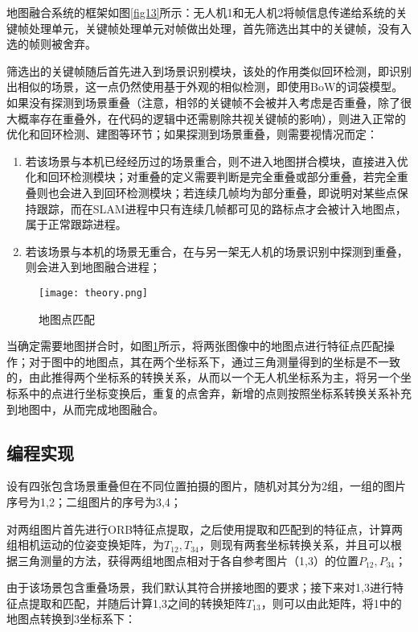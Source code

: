 地图融合系统的框架如图\ref{fig13}所示：无人机1和无人机2将帧信息传递给系统的关键帧处理单元，关键帧处理单元对帧做出处理，首先筛选出其中的关键帧，没有入选的帧则被舍弃。

筛选出的关键帧随后首先进入到场景识别模块，该处的作用类似回环检测，即识别出相似的场景，这一点仍然使用基于外观的相似检测，即使用BoW的词袋模型。如果没有探测到场景重叠（注意，相邻的关键帧不会被并入考虑是否重叠，除了很大概率存在重叠外，在代码的逻辑中还需剔除共视关键帧的影响），则进入正常的优化和回环检测、建图等环节；如果探测到场景重叠，则需要视情况而定\cite{forster2013collaborative}：

\begin{enumerate}
	\item 若该场景与本机已经经历过的场景重合，则不进入地图拼合模块，直接进入优化和回环检测模块；对重叠的定义需要判断是完全重叠或部分重叠，若完全重叠则也会进入到回环检测模块；若连续几帧均为部分重叠，即说明对某些点保持跟踪，而在SLAM进程中只有连续几帧都可见的路标点才会被计入地图点，属于正常跟踪进程。
	\item 若该场景与本机的场景无重合，在与另一架无人机的场景识别中探测到重叠，则会进入到地图融合进程；
\end{enumerate}

\begin{figure}[!ht]
	\centering
	\texttt{[image: theory.png]}
	\caption{地图点匹配}
	\label{fig14}
\end{figure}

当确定需要地图拼合时，如图\ref{fig14}所示，将两张图像中的地图点进行特征点匹配操作；对于图中的地图点，其在两个坐标系下，通过三角测量得到的坐标是不一致的，由此推得两个坐标系的转换关系，从而以一个无人机坐标系为主，将另一个坐标系中的点进行坐标变换后，重复的点舍弃，新增的点则按照坐标系转换关系补充到地图中，从而完成地图融合。


\subsection{编程实现} \label{3.4.2}

设有四张包含场景重叠但在不同位置拍摄的图片，随机对其分为2组，一组的图片序号为1,2；二组图片的序号为3,4；

对两组图片首先进行ORB特征点提取，之后使用提取和匹配到的特征点，计算两组相机运动的位姿变换矩阵，为$T_{12},T_{34}$，则现有两套坐标转换关系，并且可以根据三角测量的方法，获得两组地图点相对于各自参考图片（1,3）的位置$P_{12},P_{34}$；

由于该场景包含重叠场景，我们默认其符合拼接地图的要求；接下来对1,3进行特征点提取和匹配，并随后计算1,3之间的转换矩阵$T_{13}$，则可以由此矩阵，将1中的地图点转换到3坐标系下：

